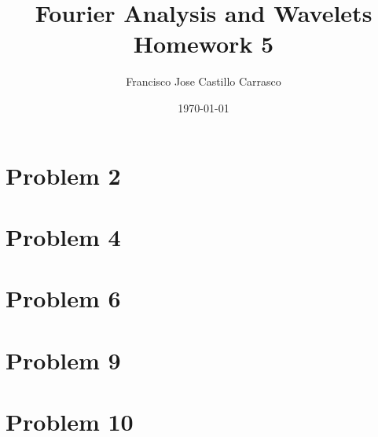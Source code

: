 




\title{Fourier Analysis and Wavelets\\Homework 5}
\author{Francisco Jose Castillo Carrasco}
\date{\today}
\maketitle




\section*{Problem 2}


\section*{Problem 4}


\section*{Problem 6}


\section*{Problem 9}


\section*{Problem 10}


%


